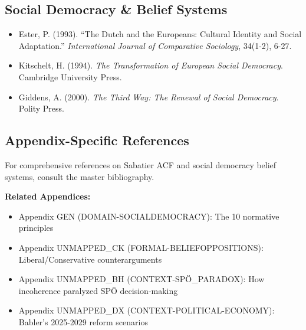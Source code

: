 \subsection{Social Democracy \& Belief Systems}

\begin{itemize}[nosep]
\item Ester, P. (1993). ``The Dutch and the Europeans: Cultural Identity and Social Adaptation.'' \textit{International Journal of Comparative Sociology}, 34(1-2), 6-27.

\item Kitschelt, H. (1994). \textit{The Transformation of European Social Democracy}. Cambridge University Press.

\item Giddens, A. (2000). \textit{The Third Way: The Renewal of Social Democracy}. Polity Press.

\end{itemize}

\nocite{bcm_master}

\subsection{Appendix-Specific References}

For comprehensive references on Sabatier ACF and social democracy belief systems, consult the master bibliography.


\begin{tcolorbox}[colback=orange!5!white, colframe=orange!75!black,
    title=Cross-Reference Links]

\textbf{Related Appendices:}
\begin{itemize}[nosep]
\item Appendix GEN (DOMAIN-SOCIALDEMOCRACY): The 10 normative principles
\item Appendix UNMAPPED_CK (FORMAL-BELIEFOPPOSITIONS): Liberal/Conservative counterarguments
\item Appendix UNMAPPED_BH (CONTEXT-SPÖ_PARADOX): How incoherence paralyzed SPÖ decision-making
\item Appendix UNMAPPED_DX (CONTEXT-POLITICAL-ECONOMY): Babler's 2025-2029 reform scenarios
\end{itemize}

\end{tcolorbox}


